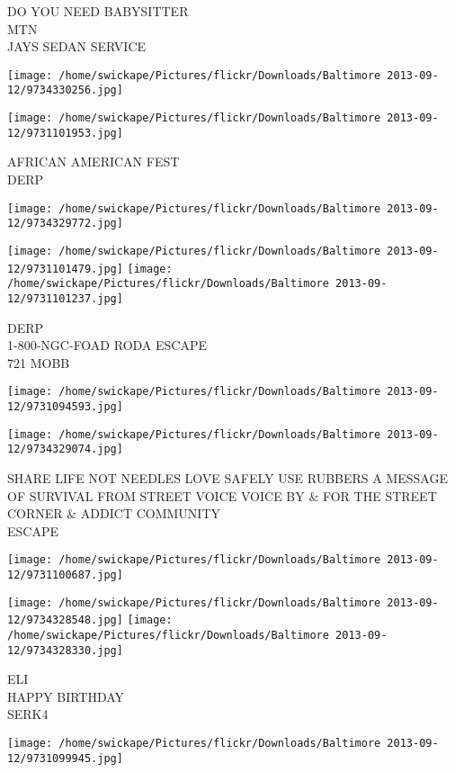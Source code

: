 \documentclass[10pt,letterpaper]{article}
\begin{document}
DO YOU NEED BABYSITTER\\
MTN\\
JAYS SEDAN SERVICE
\pagebreak

\texttt{[image: /home/swickape/Pictures/flickr/Downloads/Baltimore 2013-09-12/9734330256.jpg]}

\vspace{0.25in}
\texttt{[image: /home/swickape/Pictures/flickr/Downloads/Baltimore 2013-09-12/9731101953.jpg]}

AFRICAN AMERICAN FEST\\
DERP
\pagebreak

\texttt{[image: /home/swickape/Pictures/flickr/Downloads/Baltimore 2013-09-12/9734329772.jpg]}

\vspace{0.25in}
\texttt{[image: /home/swickape/Pictures/flickr/Downloads/Baltimore 2013-09-12/9731101479.jpg]}
\texttt{[image: /home/swickape/Pictures/flickr/Downloads/Baltimore 2013-09-12/9731101237.jpg]}

DERP\\
1{-}800{-}NGC{-}FOAD RODA ESCAPE\\
721 MOBB
\pagebreak

\texttt{[image: /home/swickape/Pictures/flickr/Downloads/Baltimore 2013-09-12/9731094593.jpg]}

\vspace{0.25in}
\texttt{[image: /home/swickape/Pictures/flickr/Downloads/Baltimore 2013-09-12/9734329074.jpg]}

SHARE LIFE NOT NEEDLES LOVE SAFELY USE RUBBERS A MESSAGE OF SURVIVAL FROM STREET VOICE VOICE BY \& FOR THE STREET CORNER \& ADDICT COMMUNITY\\
ESCAPE
\pagebreak

\texttt{[image: /home/swickape/Pictures/flickr/Downloads/Baltimore 2013-09-12/9731100687.jpg]}

\vspace{0.25in}
\texttt{[image: /home/swickape/Pictures/flickr/Downloads/Baltimore 2013-09-12/9734328548.jpg]}
\texttt{[image: /home/swickape/Pictures/flickr/Downloads/Baltimore 2013-09-12/9734328330.jpg]}

ELI\\
HAPPY BIRTHDAY\\
SERK4
\pagebreak

\texttt{[image: /home/swickape/Pictures/flickr/Downloads/Baltimore 2013-09-12/9731099945.jpg]}
\end{document}
